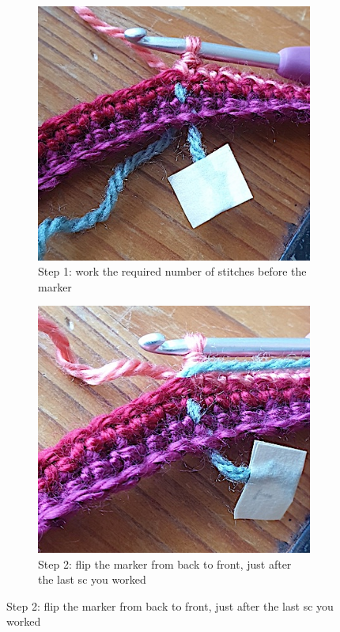 \documentclass[openany]{book}
\begin{document}
\begin{figure}[H]\centering
\begin{subfigure}[t]{.3\textwidth}
\includegraphics[width=.9\textwidth]{pic/Run1}
\caption{Step 1: work the required number of stitches before the marker}
\end{subfigure}\hfill
%
\begin{subfigure}[t]{.3\textwidth}
\includegraphics[width=.9\textwidth]{pic/Run2}
\caption{Step 2: flip the marker from back to front, just after the last sc you worked}
\end{subfigure}\hfill

\end{figure}
\end{document}
